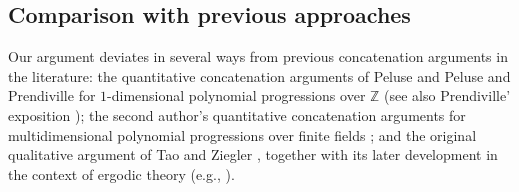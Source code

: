 \documentclass[11pt]{amsart}
\theoremstyle{definition}
\newcommand{\Z}{{\mathbb Z}}
\begin{document}
\subsection{Comparison with previous approaches}


Our argument deviates in several ways from previous concatenation arguments in the literature: the quantitative concatenation arguments of Peluse \cite{Pel20} and Peluse and Prendiville \cite{PP19} for $1$-dimensional polynomial progressions over $\Z$ (see also Prendiville' exposition \cite{Pre20b}); the second author's quantitative concatenation arguments for multidimensional polynomial progressions over finite fields \cite{Kuc23}; and the original qualitative argument of Tao and Ziegler \cite{TZ16}, together with its later development in the context of ergodic theory (e.g., \cite{DFKS22}).
\end{document}
